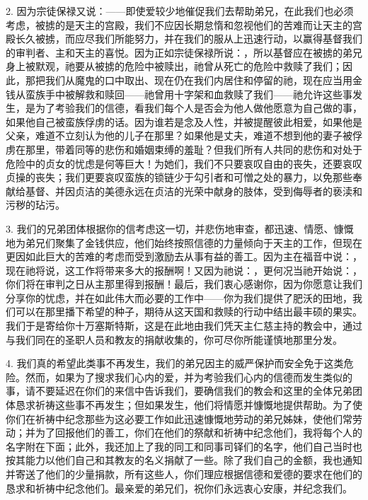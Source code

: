 2. 因为宗徒保禄又说：——即使爱较少地催促我们去帮助弟兄，在此我们也必须考虑，被掳的是天主的宫殿，我们不应因长期怠惰和忽视他们的苦难而让天主的宫殿长久被掳，而应尽我们所能努力，并在我们的服从上迅速行动，以赢得基督我们的审判者、主和天主的喜悦。因为正如宗徒保禄所说：，所以基督应在被掳的弟兄身上被默观，祂要从被掳的危险中被赎出，祂曾从死亡的危险中救赎了我们；因此，那把我们从魔鬼的口中取出、现在仍在我们内居住和停留的祂，现在应当用金钱从蛮族手中被解救和赎回——祂曾用十字架和血救赎了我们——祂允许这些事发生，是为了考验我们的信德，看我们每个人是否会为他人做他愿意为自己做的事，如果他自己被蛮族俘虏的话。因为谁若是念及人性，并被提醒彼此相爱，如果他是父亲，难道不立刻认为他的儿子在那里？如果他是丈夫，难道不想到他的妻子被俘虏在那里，带着同等的悲伤和婚姻束缚的羞耻？但我们所有人共同的悲伤和对处于危险中的贞女的忧虑是何等巨大！为她们，我们不只要哀叹自由的丧失，还要哀叹贞操的丧失；我们更要哀叹蛮族的锁链少于勾引者和可憎之处的暴力，以免那些奉献给基督、并因贞洁的美德永远在贞洁的光荣中献身的肢体，受到侮辱者的亵渎和污秽的玷污。\par

3. 我们的兄弟团体根据你的信考虑这一切，并悲伤地审查，都迅速、情愿、慷慨地为弟兄们聚集了金钱供应，他们始终按照信德的力量倾向于天主的工作，但现在更因如此巨大的苦难的考虑而受到激励去从事有益的善工。因为主在福音中说：，现在祂将说，这工作将带来多大的报酬啊！又因为祂说：，更何况当祂开始说：，你们将在审判之日从主那里得到报酬！最后，我们衷心感谢你，因为你愿意让我们分享你的忧虑，并在如此伟大而必要的工作中——你为我们提供了肥沃的田地，我们可以在那里播下希望的种子，期待从这天国和救赎的行动中结出最丰硕的果实。我们于是寄给你十万塞斯特斯，这是在此地由我们凭天主仁慈主持的教会中，通过与我们同在的圣职人员和教友的捐献收集的，你可尽你所能谨慎地那里分发。\par

4. 我们真的希望此类事不再发生，我们的弟兄因主的威严保护而安全免于这类危险。然而，如果为了搜求我们心内的爱，并为考验我们心内的信德而发生类似的事，请不要延迟在你们的来信中告诉我们，要确信我们的教会和这里的全体兄弟团体恳求祈祷这些事不再发生；但如果发生，他们将情愿并慷慨地提供帮助。为了使你们在祈祷中纪念那些为这必要工作如此迅速慷慨地劳动的弟兄姊妹，使他们常劳动；并为了回报他们的善工，你们在他们的祭献和祈祷中纪念他们，我将每个人的名字附在下面；此外，我还加上了我的同工和同事司铎们的名字，他们自己当时也按其能力以他们自己和其教友的名义捐献了一些。除了我们自己的金额，我也通知并寄送了他们的少量捐款，所有这些人，你们理应根据信德和爱德的要求在他们的恳求和祈祷中纪念他们。最亲爱的弟兄们，祝你们永远衷心安康，并纪念我们。\par

